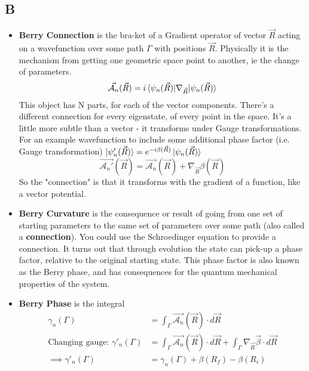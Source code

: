 \documentclass[../mattg_ti-fi_lit-review.tex]{subfiles}
\begin{document}
	\subsection{B}
	\begin{itemize}
		\item 
			\textbf{Berry Connection} is the bra-ket of a Gradient operator of vector $\vec{R}$ acting on a wavefunction over some path  $\Gamma$ with positions $\vec{R}$. Physically it is the mechanism from getting one geometric space point to another, ie the change of parameters.
			\begin{equation}
				\vec{\mathcal{A}_n}(\vec{R}) = i\braket{\psi_n(\vec{R})|\nabla_{\vec{R}}|\psi_n(\vec{R})}
			\end{equation}
			This object has N parts, for each of the vector components. There's a different connection for every eigenstate, of every point in the space. 
			It's a little more subtle than a vector - it transforms under Gauge transformations. For an example wavefunction to include some additional phase factor (i.e. Gauge transformation) $\ket{\psi_n'(\vec{R})}=e^{-i\beta(\vec{R})}\ket{\psi_n(\vec{R})}$
			\begin{equation}
				\vec{\mathcal{A}_n'}(\vec{R}) = \vec{\mathcal{A}_n}(\vec{R}) + \nabla_{\vec{R}}\beta(\vec{R})
			\end{equation}
			So the "connection" is that it transforms with the gradient of a function, like a vector potential.
		\item 
			\textbf{Berry Curvature} is the consequence or result of going from one set of starting parameters to the same set of parameters over some path (also called a \textbf{connection}). You could use the Schroedinger equation to provide a connection. It turns out that through evolution the state can pick-up a phase factor, relative to the original starting state. This phase factor is also known as the Berry phase, and has consequences for the quantum mechanical properties of the system.
		\item 
			\textbf{Berry Phase} is the integral
			\begin{align}
				\gamma_n(\Gamma) &= \int_\Gamma \vec{\mathcal{A}_n}(\vec{R})\cdot d\vec{R}\\
				\text{Changing gauge: }\gamma'_n(\Gamma) &= \int_\Gamma \vec{\mathcal{A}_n}(\vec{R})\cdot d\vec{R} + \int_\Gamma \nabla_{\vec{R}}\vec{\beta} \cdot d\vec{R}\\
				\implies \gamma'_n(\Gamma) &= \gamma_n(\Gamma) + \beta(R_f) - \beta(R_i)
			\end{align}

\end{itemize}
\end{document}
